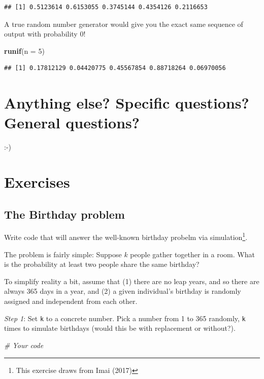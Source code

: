 \documentclass[]{book}
\newenvironment{Shaded}{\begin{snugshade}}{\end{snugshade}}
\newcommand{\KeywordTok}[1]{\textcolor[rgb]{0.13,0.29,0.53}{\textbf{#1}}}
\newcommand{\DataTypeTok}[1]{\textcolor[rgb]{0.13,0.29,0.53}{#1}}
\newcommand{\DecValTok}[1]{\textcolor[rgb]{0.00,0.00,0.81}{#1}}
\newcommand{\CommentTok}[1]{\textcolor[rgb]{0.56,0.35,0.01}{\textit{#1}}}
\newcommand{\NormalTok}[1]{#1}
\let\rmarkdownfootnote\footnote%
\def\footnote{\protect\rmarkdownfootnote}
\theoremstyle{definition}
\theoremstyle{definition}
\theoremstyle{definition}
\theoremstyle{remark}
\begin{document}
\begin{verbatim}
## [1] 0.5123614 0.6153055 0.3745144 0.4354126 0.2116653
\end{verbatim}

A true random number generator would give you the exact same sequence of
output with probability 0!

\begin{Shaded}
\begin{Highlighting}[]
\KeywordTok{runif}\NormalTok{(}\DataTypeTok{n =} \DecValTok{5}\NormalTok{)}
\end{Highlighting}
\end{Shaded}

\begin{verbatim}
## [1] 0.17812129 0.04420775 0.45567854 0.88718264 0.06970056
\end{verbatim}

\section{Anything else? Specific questions? General
questions?}\label{anything-else-specific-questions-general-questions}

:-)

\section{Exercises}\label{exercises}

\subsection{The Birthday problem}\label{the-birthday-problem}

Write code that will answer the well-known birthday probelm via
simulation\footnote{This exercise draws from Imai (2017)}.

The problem is fairly simple: Suppose \(k\) people gather together in a
room. What is the probability at least two people share the same
birthday?

To simplify reality a bit, assume that (1) there are no leap years, and
so there are always 365 days in a year, and (2) a given individual's
birthday is randomly assigned and independent from each other.

\emph{Step 1}: Set \texttt{k} to a concrete number. Pick a number from 1
to 365 randomly, \texttt{k} times to simulate birthdays (would this be
with replacement or without?).

\begin{Shaded}
\begin{Highlighting}[]
\CommentTok{# Your code}
\end{Highlighting}
\end{Shaded}
\end{document}

